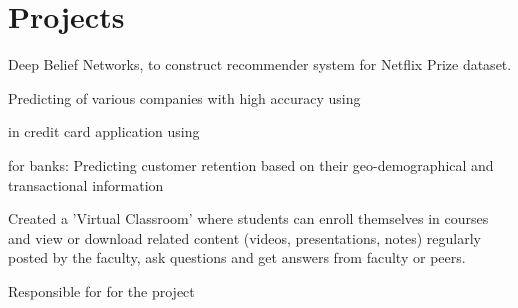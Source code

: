 \documentclass[]{deedy-resume-openfont}
\begin{document}
\hfill
\begin{minipage}[t]{0.66\textwidth} 


\section{Projects}


\href{https://github.com/Ellusionists/Deep-Learning-Models}{}
\vspace{\topsep} %
\begin{tightemize}
\item Deep Belief Networks,  to construct recommender system for Netflix Prize dataset.
\item Predicting  of various companies with high accuracy \space using   %
\item {} in credit card application using 
\item  {} for banks: Predicting customer retention based on their geo-demographical and transactional information
\end{tightemize}
\sectionsep

\href{https://github.com/Ellusionists/VirtualClassroom}{}
\begin{tightemize}
\item Created a 'Virtual Classroom' where students can enroll themselves in courses and view or download related content (videos, presentations, notes) regularly posted by the faculty, ask questions and get answers from faculty or peers.
\item Responsible for  for the project
\end{tightemize}
\sectionsep


\end{minipage}
\end{document}
